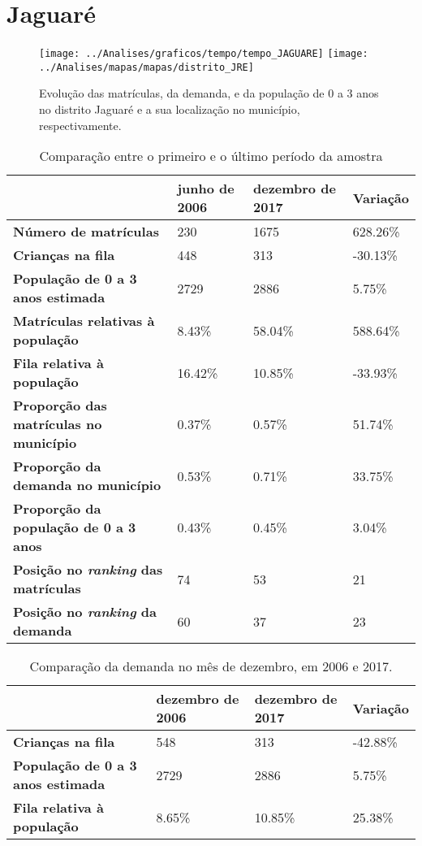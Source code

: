 \section{Jaguaré}
\begin{figure}[H]
	\centering
	\texttt{[image: ../Analises/graficos/tempo/tempo\_JAGUARE]}
	\texttt{[image: ../Analises/mapas/mapas/distrito\_JRE]}
	\caption{Evolução das matrículas, da demanda, e da população de 0 a 3 anos no distrito Jaguaré e a sua localização no município, respectivamente.}
\end{figure}
\begin{table}[H]
	\begin{tabular}{|l|l|l|l|}
		\hline
		\textbf{}                                      & \textbf{junho de 2006}       & \textbf{dezembro de 2017}    & \textbf{Variação} \\ \hline
		\textbf{Número de matrículas}                  & 230 & 1675 & 628.26\% \\ \hline
		\textbf{Crianças na fila}                      & 448 & 313 & -30.13\% \\ \hline
		\textbf{População de 0 a 3 anos estimada}      & 2729 & 2886 & 5.75\% \\ \hline
		\textbf{Matrículas relativas à população}      & 8.43\% & 58.04\% & 588.64\% \\ \hline
		\textbf{Fila relativa à população}             & 16.42\% & 10.85\% & -33.93\% \\ \hline
		\textbf{Proporção das matrículas no município} & 0.37\% & 0.57\% & 51.74\% \\ \hline
		\textbf{Proporção da demanda no município}     & 0.53\% & 0.71\% & 33.75\% \\ \hline
		\textbf{Proporção da população de 0 a 3 anos}  & 0.43\% & 0.45\% & 3.04\% \\ \hline
		\textbf{Posição no \textit{ranking} das matrículas}     & 74 & 53 & 21 \\ \hline
		\textbf{Posição no \textit{ranking} da demanda}         & 60 & 37 & 23 \\ \hline
	\end{tabular}
	\caption{Comparação entre o primeiro e o último período da amostra}
\end{table}
\begin{table}[H]
	\begin{tabular}{|l|l|l|l|}
		\hline
		\textbf{}                                 & \textbf{dezembro de 2006} & \textbf{dezembro de 2017} & \textbf{Variação} \\ \hline
		\textbf{Crianças na fila}                      & 548 & 313 & -42.88\% \\ \hline
		\textbf{População de 0 a 3 anos estimada}      & 2729 & 2886 & 5.75\% \\ \hline
		\textbf{Fila relativa à população}             & 8.65\% & 10.85\% & 25.38\% \\ \hline
	\end{tabular}
	\caption{Comparação da demanda no mês de dezembro, em 2006 e 2017.}
\end{table}

